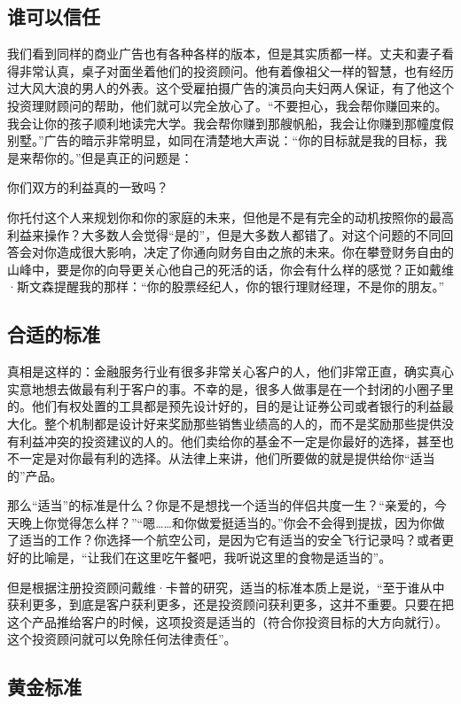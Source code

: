 \subsection{谁可以信任}

我们看到同样的商业广告也有各种各样的版本，但是其实质都一样。丈夫和妻子看得非常认真，桌子对面坐着他们的投资顾问。他有着像祖父一样的智慧，也有经历过大风大浪的男人的外表。这个受雇拍摄广告的演员向夫妇两人保证，有了他这个投资理财顾问的帮助，他们就可以完全放心了。“不要担心，我会帮你赚回来的。我会让你的孩子顺利地读完大学。我会帮你赚到那艘帆船，我会让你赚到那幢度假别墅。”广告的暗示非常明显，如同在清楚地大声说：“你的目标就是我的目标，我是来帮你的。”但是真正的问题是：

你们双方的利益真的一致吗？

你托付这个人来规划你和你的家庭的未来，但他是不是有完全的动机按照你的最高利益来操作？大多数人会觉得“是的”，但是大多数人都错了。对这个问题的不同回答会对你造成很大影响，决定了你通向财务自由之旅的未来。你在攀登财务自由的山峰中，要是你的向导更关心他自己的死活的话，你会有什么样的感觉？正如戴维·斯文森提醒我的那样：“你的股票经纪人，你的银行理财经理，不是你的朋友。”

\subsection{合适的标准}

真相是这样的：金融服务行业有很多非常关心客户的人，他们非常正直，确实真心实意地想去做最有利于客户的事。不幸的是，很多人做事是在一个封闭的小圈子里的。他们有权处置的工具都是预先设计好的，目的是让证券公司或者银行的利益最大化。整个机制都是设计好来奖励那些销售业绩高的人的，而不是奖励那些提供没有利益冲突的投资建议的人的。他们卖给你的基金不一定是你最好的选择，甚至也不一定是对你最有利的选择。从法律上来讲，他们所要做的就是提供给你“适当的”产品。

那么“适当”的标准是什么？你是不是想找一个适当的伴侣共度一生？“亲爱的，今天晚上你觉得怎么样？”“嗯……和你做爱挺适当的。”你会不会得到提拔，因为你做了适当的工作？你选择一个航空公司，是因为它有适当的安全飞行记录吗？或者更好的比喻是，“让我们在这里吃午餐吧，我听说这里的食物是适当的”。

但是根据注册投资顾问戴维·卡普的研究，适当的标准本质上是说，“至于谁从中获利更多，到底是客户获利更多，还是投资顾问获利更多，这并不重要。只要在把这个产品推给客户的时候，这项投资是适当的（符合你投资目标的大方向就行）。这个投资顾问就可以免除任何法律责任”。

\subsection{黄金标准}

